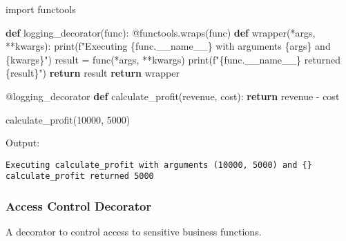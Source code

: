 \documentclass[
  letterpaper,
  DIV=11,
  numbers=noendperiod]{scrreprt}
\newenvironment{Shaded}{\begin{snugshade}}{\end{snugshade}}
\newcommand{\AttributeTok}[1]{\textcolor[rgb]{0.40,0.45,0.13}{#1}}
\newcommand{\BuiltInTok}[1]{\textcolor[rgb]{0.00,0.23,0.31}{#1}}
\newcommand{\ControlFlowTok}[1]{\textcolor[rgb]{0.00,0.23,0.31}{\textbf{#1}}}
\newcommand{\DecValTok}[1]{\textcolor[rgb]{0.68,0.00,0.00}{#1}}
\newcommand{\ImportTok}[1]{\textcolor[rgb]{0.00,0.46,0.62}{#1}}
\newcommand{\KeywordTok}[1]{\textcolor[rgb]{0.00,0.23,0.31}{\textbf{#1}}}
\newcommand{\NormalTok}[1]{\textcolor[rgb]{0.00,0.23,0.31}{#1}}
\newcommand{\OperatorTok}[1]{\textcolor[rgb]{0.37,0.37,0.37}{#1}}
\newcommand{\SpecialCharTok}[1]{\textcolor[rgb]{0.37,0.37,0.37}{#1}}
\newcommand{\SpecialStringTok}[1]{\textcolor[rgb]{0.13,0.47,0.30}{#1}}
\newcommand{\VariableTok}[1]{\textcolor[rgb]{0.07,0.07,0.07}{#1}}
\begin{document}
\begin{Shaded}
\begin{Highlighting}[]
\ImportTok{import}\NormalTok{ functools}

\KeywordTok{def}\NormalTok{ logging\_decorator(func):}
    \AttributeTok{@functools.wraps}\NormalTok{(func)}
    \KeywordTok{def}\NormalTok{ wrapper(}\OperatorTok{*}\NormalTok{args, }\OperatorTok{**}\NormalTok{kwargs):}
        \BuiltInTok{print}\NormalTok{(}\SpecialStringTok{f"Executing }\SpecialCharTok{\{}\NormalTok{func}\SpecialCharTok{.}\VariableTok{\_\_name\_\_}\SpecialCharTok{\}}\SpecialStringTok{ with arguments }\SpecialCharTok{\{}\NormalTok{args}\SpecialCharTok{\}}\SpecialStringTok{ and }\SpecialCharTok{\{}\NormalTok{kwargs}\SpecialCharTok{\}}\SpecialStringTok{"}\NormalTok{)}
\NormalTok{        result }\OperatorTok{=}\NormalTok{ func(}\OperatorTok{*}\NormalTok{args, }\OperatorTok{**}\NormalTok{kwargs)}
        \BuiltInTok{print}\NormalTok{(}\SpecialStringTok{f"}\SpecialCharTok{\{}\NormalTok{func}\SpecialCharTok{.}\VariableTok{\_\_name\_\_}\SpecialCharTok{\}}\SpecialStringTok{ returned }\SpecialCharTok{\{}\NormalTok{result}\SpecialCharTok{\}}\SpecialStringTok{"}\NormalTok{)}
        \ControlFlowTok{return}\NormalTok{ result}
    \ControlFlowTok{return}\NormalTok{ wrapper}

\AttributeTok{@logging\_decorator}
\KeywordTok{def}\NormalTok{ calculate\_profit(revenue, cost):}
    \ControlFlowTok{return}\NormalTok{ revenue }\OperatorTok{{-}}\NormalTok{ cost}

\NormalTok{calculate\_profit(}\DecValTok{10000}\NormalTok{, }\DecValTok{5000}\NormalTok{)}
\end{Highlighting}
\end{Shaded}

Output:

\begin{verbatim}
Executing calculate_profit with arguments (10000, 5000) and {}
calculate_profit returned 5000
\end{verbatim}

\subsubsection{Access Control Decorator}\label{access-control-decorator}

A decorator to control access to sensitive business functions.
\end{document}
